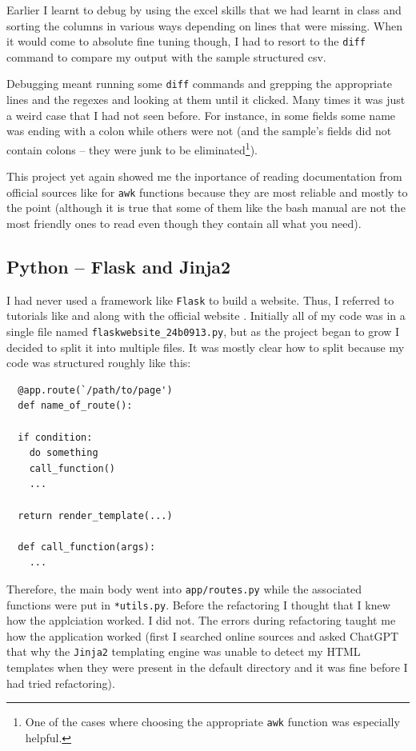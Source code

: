 \documentclass[11pt]{scrartcl}
\begin{document}
Earlier I learnt to debug by using the excel skills that we had learnt in class
and sorting the columns in various ways depending on lines that were missing.
When it would come to absolute fine tuning though, I had to resort to the
\texttt{diff} command to compare my output with the sample structured csv.

Debugging meant running some \texttt{diff} commands and grepping the appropriate
lines and the regexes and looking at them until it clicked. Many times it was
just a weird case that I had not seen before. For instance, in some fields some
name was ending with a colon while others were not (and the sample's fields did
not contain colons -- they were junk to be eliminated\footnote{One of the cases
where choosing the appropriate \texttt{awk} function was especially helpful.}).

This project yet again showed me the inportance of reading documentation from
official sources like \cite{gawk-builtin-functions} for \texttt{awk} functions
because they are most reliable and mostly to the point (although it is true that
some of them like the bash manual are not the most friendly ones to read even
though they contain all what you need).




\subsection{Python -- Flask and Jinja2}

I had never used a framework like \texttt{Flask} to build a website. Thus, I
referred to tutorials like \cite{flasktutorial} and
\cite{learnflaskfreecodecamp} along with the official website \cite{flaskdocs}.
Initially all of my code was in a single file named
\texttt{flaskwebsite\_24b0913.py}, but as the project began to grow I decided to
split it into multiple files. It was mostly clear how to split because my code
was structured roughly like this:

\begin{verbatim}
  @app.route(`/path/to/page')
  def name_of_route():

  if condition:
    do something
    call_function()
    ...

  return render_template(...)

  def call_function(args):
    ...
\end{verbatim}

Therefore, the main body went into \texttt{app/routes.py} while the associated
functions were put in \texttt{*utils.py}. Before the refactoring I thought that
I knew how the applciation worked. I did not. The errors during refactoring
taught me how the application worked (first I searched online sources and asked
ChatGPT that why the \texttt{Jinja2} templating engine was unable to detect my
HTML templates when they were present in the default directory and it was fine
before I had tried refactoring).
\end{document}

